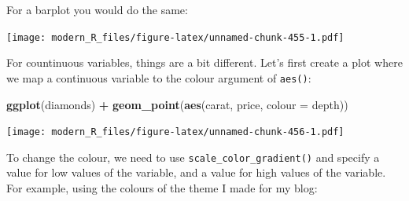 \documentclass[]{gitbook}
\newenvironment{Shaded}{\begin{snugshade}}{\end{snugshade}}
\newcommand{\DataTypeTok}[1]{\textcolor[rgb]{0.13,0.29,0.53}{#1}}
\newcommand{\FloatTok}[1]{\textcolor[rgb]{0.00,0.00,0.81}{#1}}
\newcommand{\KeywordTok}[1]{\textcolor[rgb]{0.13,0.29,0.53}{\textbf{#1}}}
\newcommand{\NormalTok}[1]{#1}
\newcommand{\OperatorTok}[1]{\textcolor[rgb]{0.81,0.36,0.00}{\textbf{#1}}}
\newcommand{\StringTok}[1]{\textcolor[rgb]{0.31,0.60,0.02}{#1}}
\begin{document}
For a barplot you would do the same:

\begin{Shaded}
\end{Shaded}

\texttt{[image: modern\_R\_files/figure-latex/unnamed-chunk-455-1.pdf]}

For countinuous variables, things are a bit different. Let's first create a plot where we map a continuous
variable to the colour argument of \texttt{aes()}:

\begin{Shaded}
\begin{Highlighting}[]
\KeywordTok{ggplot}\NormalTok{(diamonds) }\OperatorTok{+}
\StringTok{  }\KeywordTok{geom_point}\NormalTok{(}\KeywordTok{aes}\NormalTok{(carat, price, }\DataTypeTok{colour =}\NormalTok{ depth))}
\end{Highlighting}
\end{Shaded}

\texttt{[image: modern\_R\_files/figure-latex/unnamed-chunk-456-1.pdf]}

To change the colour, we need to use \texttt{scale\_color\_gradient()} and specify a value for low values of the variable,
and a value for high values of the variable. For example, using the colours of the theme I made for my blog:
\end{document}
